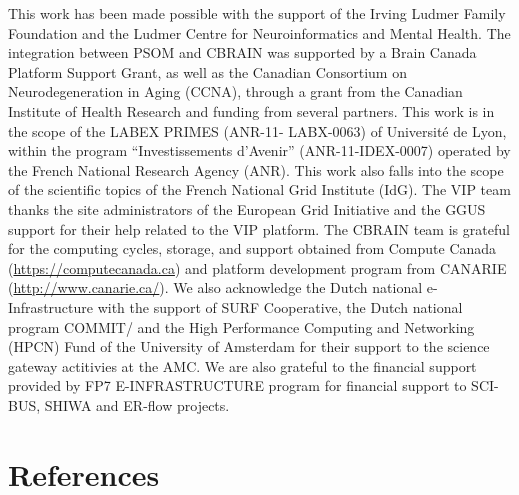 \documentclass[preprint,3p,twocolumn]{elsarticle}
\newcommand{\note}[2]{\pdfmargincomment[color=yellow,author=#1,open=true]{#2}}
\newcommand{\closednote}[4]{} %
\newcommand{\closedanswerednote}[6]{}
\begin{document}
This work has been made possible with the support of the Irving Ludmer
Family Foundation and the Ludmer Centre for Neuroinformatics and
Mental Health. The integration between PSOM and CBRAIN was supported
by a Brain Canada Platform Support Grant, as well as the Canadian
Consortium on Neurodegeneration in Aging (CCNA), through a grant from
the Canadian Institute of Health Research and funding from several
partners.  This work is in the scope of the LABEX PRIMES (ANR-11-
LABX-0063) of Universit\'e de Lyon, within the program
``Investissements d’Avenir'' (ANR-11-IDEX-0007) operated by the French
National Research Agency (ANR). This work also falls into the scope of
the scientific topics of the French National Grid Institute (IdG). The
VIP team thanks the site administrators of the European Grid
Initiative and the GGUS support for their help related to the VIP
platform. The CBRAIN team is grateful for the computing cycles,
storage, and support obtained from Compute Canada
(\url{https://computecanada.ca}) and platform development program from
CANARIE (\url{http://www.canarie.ca/}). We also acknowledge the Dutch
national e-Infrastructure with the support of SURF Cooperative, the
Dutch national program COMMIT/ and the High Performance Computing and
Networking (HPCN) Fund of the University of Amsterdam for their
support to the science gateway actitivies at the AMC.  We are also
grateful to the financial support provided by FP7 E-INFRASTRUCTURE
program for financial support to SCI-BUS, SHIWA and ER-flow
projects. \closedanswerednote{Marc-e}{Would it be proper to thank EGI?
  Compute Canada? CANARIE?}{Tristan}{Added EGI and Compute Canada. Not
  sure if Canarie should be added. What about Calcul QC?}{Marc-e}{CQ,
  no. CANARIE, I'd say yes since they funded a major chunk of CBRAIN's
  development.} \closednote{sil}{should we then also thank the dutch crowd?
	 We also acknowledge the Dutch national e-Infrastructure with the support of SURF Cooperative,  the Dutch national program COMMIT/ and the High Performance Computing and Networking (HPCN) Fund of the University of Amsterdam for their support to the science gateway actitivies at the AMC. 
	 We are also greatful to the financial support provided by FP7 E-INFRASTRUCTURE program for financial support to SCI_BUS, SHIWA and ER-flow projects. My participation has been minimal, and the amc gateways are not discussed in detail (my fault), so maybe it would be an overkill}{Tristan}{done.}

\section*{References}

\enlargethispage{5mm}


\end{document}
